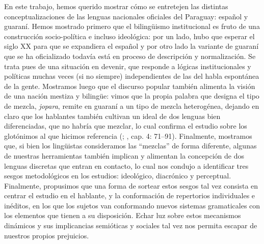 \documentclass[output=paper]{langscibook}
\begin{document}
En este trabajo, hemos querido mostrar cómo se entretejen las distintas conceptualizaciones de las lenguas nacionales oficiales del Paraguay: español y guaraní. Hemos mostrado primero que el bilingüismo institucional es fruto de una construcción socio-política e incluso ideológica: por un lado, hubo que esperar el siglo XX para que se expandiera el español y por otro lado la variante de guaraní que se ha oficializado todavía está en proceso de descripción y normalización. Se trata pues de una situación en devenir, que responde a lógicas institucionales y políticas muchas veces (si no siempre) independientes de las del habla espontánea de la gente. Mostramos luego que el discurso popular también alimenta la visión de una nación mestiza y bilingüe: vimos que la propia palabra que designa el tipo de mezcla, \textit{jopara}, remite en guaraní a un tipo de mezcla heterogénea, dejando en claro que los hablantes también cultivan un ideal de dos lenguas bien diferenciadas, que no habría que mezclar, lo cual confirma el estudio sobre los glotónimos al que hicimos referencia (\citealt{Penner2003}; \citeyear{Penner2014}, cap. 4: 71--91). Finalmente, mostramos que, si bien los lingüistas consideramos las “mezclas” de forma diferente, algunas de nuestras herramientas también implican y alimentan la concepción de dos lenguas discretas que entran en contacto, lo cual nos condujo a identificar tres sesgos metodológicos en los estudios: ideológico, diacrónico y perceptual. Finalmente, propusimos que una forma de sortear estos sesgos tal vez consista en centrar el estudio en el hablante, y la conformación de repertorios individuales e inéditos, en los que los sujetos van conformando nuevos sistemas gramaticales con los elementos que tienen a su disposición. Echar luz sobre estos mecanismos dinámicos y sus implicancias semióticas y sociales tal vez nos permita escapar de nuestros propios prejuicios.

\sloppy\printbibliography[heading=subbibliography,notkeyword=this]
\end{document}
